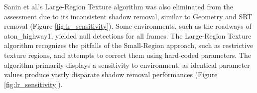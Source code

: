 
Sanin et al.'s Large-Region Texture algorithm was also eliminated from the assessment due to its inconsistent shadow removal, similar to Geometry and SRT removal (Figure \ref{fig:lr_sensitivity}). Some environments, such as the roadways of aton\_highway1, yielded null detections for all frames. The Large-Region Texture algorithm recognizes the pitfalls of the Small-Region approach, such as restrictive texture regions, and attempts to correct them using hard-coded parameters. The algorithm primarily displays a sensitivity to environment, as identical parameter values produce vastly disparate shadow removal performances (Figure \ref{fig:lr_sensitivity}). 


